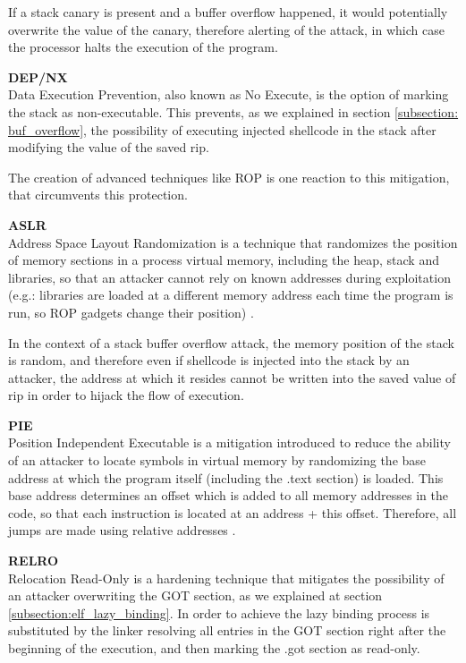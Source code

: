 If a stack canary is present and a buffer overflow happened, it would potentially overwrite the value of the canary, therefore alerting of the attack, in which case the processor halts the execution of the program.

\textbf{DEP/NX}\\
Data Execution Prevention, also known as No Execute, is the option of marking the stack as non-executable. This prevents, as we explained in section \ref{subsection: buf_overflow}, the possibility of executing injected shellcode in the stack after modifying the value of the saved rip.

The creation of advanced techniques like ROP is one reaction to this mitigation, that circumvents this protection.

\textbf{ASLR}\\
Address Space Layout Randomization is a technique that randomizes the position of memory sections in a process virtual memory, including the heap, stack and libraries, so that an attacker cannot rely on known addresses during exploitation (e.g.: libraries are loaded at a different memory address each time the program is run, so ROP gadgets change their position) \cite{aslr_pie_intro}.

In the context of a stack buffer overflow attack, the memory position of the stack is random, and therefore even if shellcode is injected into the stack by an attacker, the address at which it resides cannot be written into the saved value of rip in order to hijack the flow of execution.

\textbf{PIE}\\
Position Independent Executable is a mitigation introduced to reduce the ability of an attacker to locate symbols in virtual memory by randomizing the base address at which the program itself (including the .text section) is loaded. This base address determines an offset which is added to all memory addresses in the code, so that each instruction is located at an address + this offset. Therefore, all jumps are made using relative addresses \cite{aslr_pie_intro}.

\textbf{RELRO}\\
Relocation Read-Only is a hardening technique that mitigates the possibility of an attacker overwriting the GOT section, as we explained at section \ref{subsection:elf_lazy_binding}. In order to achieve the lazy binding process is substituted by the linker resolving all entries in the GOT section right after the beginning of the execution, and then marking the .got section as read-only. 

